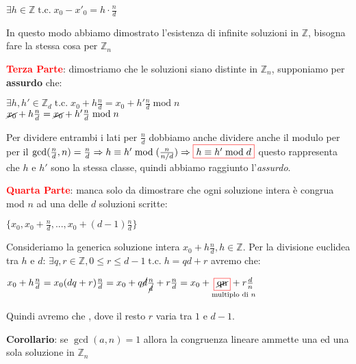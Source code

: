 \begin{boxA}
    {\centering
        $\exists h \in \mathbb{Z} \; \text{t.c.} \; x_0 - x'_0 = h \cdot \frac{n}{d}$
    \par}
    In questo modo abbiamo dimostrato l'esistenza di infinite soluzioni in $\mathbb{Z}$, bisogna fare la stessa cosa per $\mathbb{Z}_n$

    \textcolor{red}{\textbf{Terza Parte}}: dimostriamo che le soluzioni siano distinte in $\mathbb{Z}_n$, supponiamo per \textbf{assurdo} che:
    
    {\centering
        $\exists h, h' \in \mathbb{Z}_d \; \text{t.c.} \; x_0 + h \frac{n}{d} = x_0 + h' \frac{n}{d} \; \text{mod} \; n$ \\
        $\cancel{x_0} + h \frac{n}{d} = \cancel{x_0} + h' \frac{n}{d} \; \text{mod} \; n$
    \par}
    Per dividere entrambi i lati per $\frac{n}{d}$ dobbiamo anche dividere anche il modulo per per il $\gcd (\frac{n}{d}, n) = \frac{n}{d} \Rightarrow h \equiv h' \; \text{mod} \; (\frac{n}{n / d}) \Rightarrow \fcolorbox{red}{white}{$h \equiv h' \; \text{mod} \; d$}$ questo rappresenta che $h$ e $h'$ sono la stessa classe, quindi abbiamo raggiunto l'\textit{assurdo}.

    \textcolor{red}{\textbf{Quarta Parte}}: manca solo da dimostrare che ogni soluzione intera è congrua mod $n$ ad una delle $d$ soluzioni scritte:

    {\centering
        $\{x_0, x_0 + \frac{n}{d}, ..., x_0 + (d-1) \frac{n}{d}\}$
    \par}
    Consideriamo la generica soluzione intera $x_0 + h \frac{n}{d}, h \in \mathbb{Z}$. Per la divisione euclidea tra $h$ e $d$: $\exists q, r \in \mathbb{Z}, 0 \leq r \leq d - 1 \; \text{t.c.} \; h = qd + r$ avremo che:

    {\centering
        $x_0 + h \frac{n}{d} = x_0 (dq + r) \frac{n}{d} = x_0 + q\cancel{d}\frac{n}{\cancel{d}} + r \frac{n}{d} = x_0 + \underset{\text{multiplo di } n}{\fcolorbox{red}{white}{\cancel{qn}} + r \frac{d}{n}}$
    \par}
    Quindi avremo che , dove il resto $r$ varia tra $1$ e $d - 1$.
\end{boxA}

\begin{flushleft}
    \textbf{Corollario}: se $\gcd (a, n) = 1$ allora la congruenza lineare  ammette una ed una sola soluzione in $\mathbb{Z}_n$
\end{flushleft}

